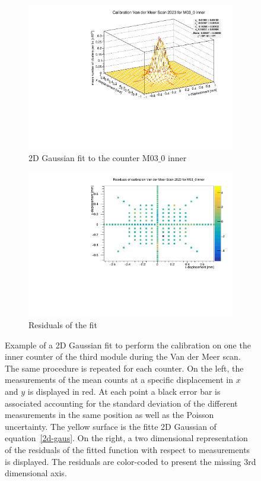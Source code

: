 \begin{figure}
    \centering
    \begin{subfigure}{0.48\textwidth}
    \includegraphics[width=\linewidth]{figures/M03_0.pdf}
    \caption{2D Gaussian fit to the counter M$03\_0$ inner}\label{fig:fit_M03}
    \end{subfigure}
    \begin{subfigure}{0.48\textwidth}
    \includegraphics[width=\linewidth]{figures/M03_0_res.pdf}
    \caption{Residuals of the fit}\label{fig:M03_res}
    \end{subfigure}
    \caption{Example of a 2D Gaussian fit to perform the calibration on one the inner counter of the third module during the Van der Meer scan. The same procedure is repeated for each counter. On the left, the measurements of the mean counts at a specific displacement in $x$ and $y$ is displayed in red. At each point a black error bar is associated accounting for the standard deviation of the different measurements in the same position as well as the Poisson uncertainty. The yellow surface is the fitte 2D Gaussian of equation~\eqref{2d-gaus}. On the right, a two dimensional representation of the residuals of the fitted function with respect to measurements is displayed. The residuals are color-coded to present the missing 3rd dimensional axis.}
    \label{fig:fit_example}
\end{figure}

